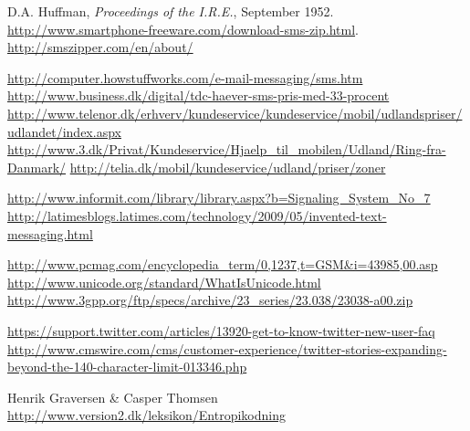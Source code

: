  D.A. Huffman, {\it Proceedings of the I.R.E.}, September 1952.
 {\url{http://www.smartphone-freeware.com/download-sms-zip.html}}.
 {\url{http://smszipper.com/en/about/}}

 {\url{http://computer.howstuffworks.com/e-mail-messaging/sms.htm}}
 {\url{http://www.business.dk/digital/tdc-haever-sms-pris-med-33-procent}}
 {\url{http://www.telenor.dk/erhverv/kundeservice/kundeservice/mobil/udlandspriser/udlandet/index.aspx}}
 {\url{http://www.3.dk/Privat/Kundeservice/Hjaelp_til_mobilen/Udland/Ring-fra-Danmark/}}
 {\url{http://telia.dk/mobil/kundeservice/udland/priser/zoner}}

 {\url{http://www.informit.com/library/library.aspx?b=Signaling_System_No_7}}
 {\url{http://latimesblogs.latimes.com/technology/2009/05/invented-text-messaging.html}}

 {\url{http://www.pcmag.com/encyclopedia_term/0,1237,t=GSM&i=43985,00.asp}}
 {\url{http://www.unicode.org/standard/WhatIsUnicode.html}}
 {\url{http://www.3gpp.org/ftp/specs/archive/23_series/23.038/23038-a00.zip}}


 {\url{https://support.twitter.com/articles/13920-get-to-know-twitter-new-user-faq}}
 {\url{http://www.cmswire.com/cms/customer-experience/twitter-stories-expanding-beyond-the-140-character-limit-013346.php}}


 Henrik Graversen \& Casper Thomsen {\url{http://www.version2.dk/leksikon/Entropikodning}}



